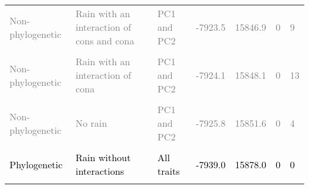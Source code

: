 \documentclass[
  12pt,
  letterpaper,
  DIV=11,
  numbers=noendperiod]{scrartcl}
\begin{document}
\begin{table}[H]
{\begin{tabular}[t]{lllllll}
\textcolor{gray}{Non-phylogenetic} & \textcolor{gray}{Rain with an interaction of cons and cona} & \textcolor{gray}{PC1 and PC2} & \textcolor{gray}{-7923.5} & \textcolor{gray}{15846.9} & \textcolor{gray}{0} & \textcolor{gray}{9}\\
\cellcolor{gray!6}{\textcolor{gray}{Non-phylogenetic}} & \cellcolor{gray!6}{\textcolor{gray}{Rain without interactions}} & \cellcolor{gray!6}{\textcolor{gray}{PC1 and PC2}} & \cellcolor{gray!6}{\textcolor{gray}{-7924.0}} & \cellcolor{gray!6}{\textcolor{gray}{15848.0}} & \cellcolor{gray!6}{\textcolor{gray}{0}} & \cellcolor{gray!6}{\textcolor{gray}{9}}\\
\textcolor{gray}{Non-phylogenetic} & \textcolor{gray}{Rain with an interaction of cona} & \textcolor{gray}{PC1 and PC2} & \textcolor{gray}{-7924.1} & \textcolor{gray}{15848.1} & \textcolor{gray}{0} & \textcolor{gray}{13}\\
\addlinespace
\cellcolor{gray!6}{\textcolor{gray}{Non-phylogenetic}} & \cellcolor{gray!6}{\textcolor{gray}{Rain with an interaction of cons}} & \cellcolor{gray!6}{\textcolor{gray}{PC1 and PC2}} & \cellcolor{gray!6}{\textcolor{gray}{-7925.2}} & \cellcolor{gray!6}{\textcolor{gray}{15850.3}} & \cellcolor{gray!6}{\textcolor{gray}{0}} & \cellcolor{gray!6}{\textcolor{gray}{21}}\\
\textcolor{gray}{Non-phylogenetic} & \textcolor{gray}{No rain} & \textcolor{gray}{PC1 and PC2} & \textcolor{gray}{-7925.8} & \textcolor{gray}{15851.6} & \textcolor{gray}{0} & \textcolor{gray}{4}\\
\cellcolor{gray!6}{\textcolor{black}{Phylogenetic}} & \cellcolor{gray!6}{\textcolor{black}{No rain}} & \cellcolor{gray!6}{\textcolor{black}{All traits}} & \cellcolor{gray!6}{\textcolor{black}{-7938.6}} & \cellcolor{gray!6}{\textcolor{black}{15877.1}} & \cellcolor{gray!6}{\textcolor{black}{0}} & \cellcolor{gray!6}{\textcolor{black}{0}}\\
\textcolor{black}{Phylogenetic} & \textcolor{black}{Rain without interactions} & \textcolor{black}{All traits} & \textcolor{black}{-7939.0} & \textcolor{black}{15878.0} & \textcolor{black}{0} & \textcolor{black}{0}\\
\cellcolor{gray!6}{\textcolor{black}{Non-phylogenetic}} & \cellcolor{gray!6}{\textcolor{black}{No rain}} & \cellcolor{gray!6}{\textcolor{black}{All traits}} & \cellcolor{gray!6}{\textcolor{black}{-7939.2}} & \cellcolor{gray!6}{\textcolor{black}{15878.5}} & \cellcolor{gray!6}{\textcolor{black}{0}} & \cellcolor{gray!6}{\textcolor{black}{0}}\\

\end{tabular}}
\end{table}
\end{document}
